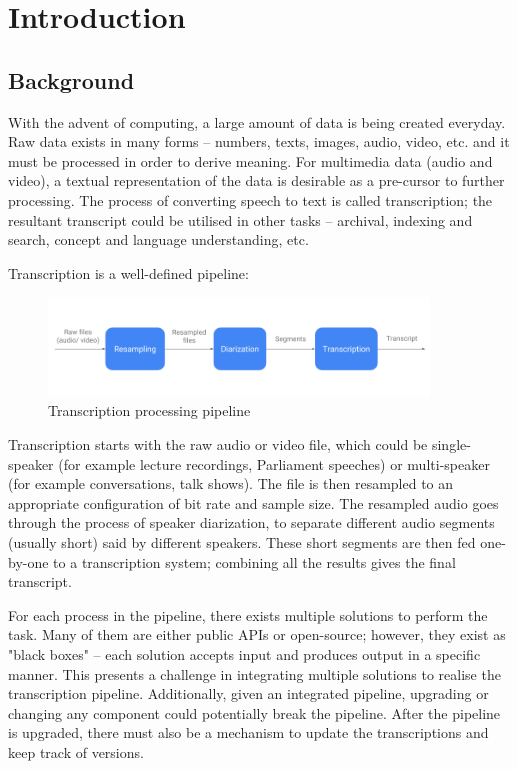 \chapter{Introduction}

\section{Background}

With the advent of computing, a large amount of data is being created everyday. Raw data exists in many forms -- numbers, texts, images, audio, video, etc. and it must be processed in order to derive meaning. For multimedia data (audio and video), a textual representation of the data is desirable as a pre-cursor to further processing. The process of converting speech to text is called transcription; the resultant transcript could be utilised in other tasks -- archival, indexing and search, concept and language understanding, etc.

Transcription is a well-defined pipeline:

\begin{figure}[h]
\begin{center}
    \includegraphics[width=0.9\textwidth]{images/pipeline.png}
    \caption{Transcription processing pipeline}
\end{center}
\end{figure}

Transcription starts with the raw audio or video file, which could be single-speaker (for example lecture recordings, Parliament speeches) or multi-speaker (for example conversations, talk shows). The file is then resampled to an appropriate configuration of bit rate and sample size. The resampled audio goes through the process of speaker diarization, to separate different audio segments (usually short) said by different speakers. These short segments are then fed one-by-one to a transcription system; combining all the results gives the final transcript.

For each process in the pipeline, there exists multiple solutions to perform the task. Many of them are either public APIs or open-source; however, they exist as "black boxes" -- each solution accepts input and produces output in a specific manner. This presents a challenge in integrating multiple solutions to realise the transcription pipeline. Additionally, given an integrated pipeline, upgrading or changing any component could potentially break the pipeline. After the pipeline is upgraded, there must also be a mechanism to update the transcriptions and keep track of versions. 

